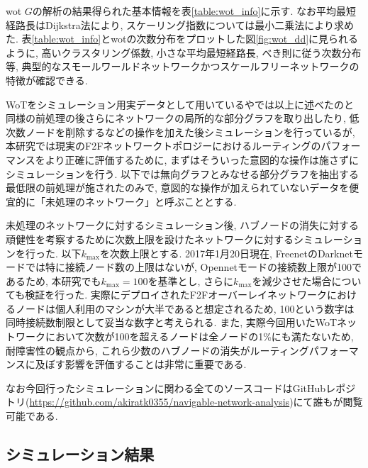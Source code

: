 \documentclass[dvipdfmx]{ampbt}
\begin{document}
  \acrshort{wot} $G$の解析の結果得られた基本情報を表\ref{table:wot_info}に示す. なお平均最短経路長はDijkstra法により, スケーリング指数については最小二乗法により求めた. 表\ref{table:wot_info}と\acrshort{wot}の次数分布をプロットした図\ref{fig:wot_dd}に見られるように, 高いクラスタリング係数, 小さな平均最短経路長, べき則に従う次数分布等, 典型的なスモールワールドネットワークかつスケールフリーネットワークの特徴が確認できる. 

 WoTをシミュレーション用実データとして用いている\cite{sandberg2006distributed}や\cite{clarke2010private}では以上に述べたのと同様の前処理の後さらにネットワークの局所的な部分グラフを取り出したり, 低次数ノードを削除するなどの操作を加えた後シミュレーションを行っているが, 本研究では現実のF2Fネットワークトポロジーにおけるルーティングのパフォーマンスをより正確に評価するために, まずはそういった意図的な操作は施さずにシミュレーションを行う. 以下では無向グラフとみなせる部分グラフを抽出する最低限の前処理が施されたのみで, 意図的な操作が加えられていないデータを便宜的に「未処理のネットワーク」と呼ぶこととする.

未処理のネットワークに対するシミュレーション後, ハブノードの消失に対する頑健性を考察するために次数上限を設けたネットワークに対するシミュレーションを行った. 以下$k_{\max}$を次数上限とする. 2017年1月20日現在, FreenetのDarknetモードでは特に接続ノード数の上限はないが, Opennetモードの接続数上限が100であるため, 本研究でも$k_{\max}=100$を基準とし, さらに$k_{\max}$を減少させた場合についても検証を行った. 実際にデプロイされたF2Fオーバーレイネットワークにおけるノードは個人利用のマシンが大半であると想定されるため, 100という数字は同時接続数制限として妥当な数字と考えられる. また, 実際今回用いたWoTネットワークにおいて次数が100を超えるノードは全ノードの1\%にも満たないため, 耐障害性の観点から, これら少数のハブノードの消失がルーティングパフォーマンスに及ぼす影響を評価することは非常に重要である.

なお今回行ったシミュレーションに関わる全てのソースコードはGitHubレポジトリ(\url{https://github.com/akiratk0355/navigable-network-analysis})にて誰もが閲覧可能である.


  \subsection{シミュレーション結果}
\end{document}
